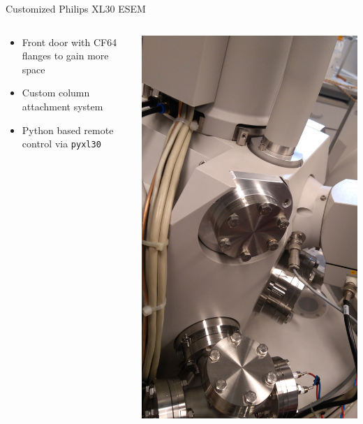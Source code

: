 \documentclass[final]{beamer}
\begin{document}
\begin{frame}[fragile]{}
\begin{columns}[T]
\begin{column}{.49\linewidth}
\begin{block}{\Large Customized Philips XL30 ESEM}
\begin{columns}
\begin{column}{0.225\columnwidth}
\begin{itemize}
					\item Front door with CF64 flanges to gain more space
					\item Custom column attachment system
					\item Python based remote control via \texttt{pyxl30}
				\end{itemize}
			\end{column}
			\begin{column}{0.225\columnwidth}
				\includegraphics[width=\columnwidth]{./figures/flanges02.jpg}

\end{column}
\end{columns}
\end{block}
\end{column}
\end{columns}
\end{frame}
\end{document}

